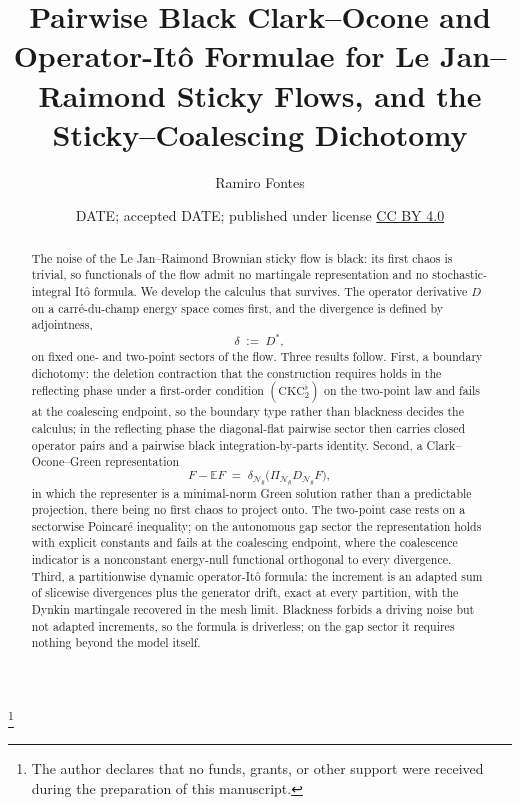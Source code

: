 \documentclass[reqno,final,11pt]{amsart}
\date{DATE; accepted DATE; published under license
\href{https://creativecommons.org/licenses/by/4.0/}{\textup{CC BY 4.0}}} %
\theoremstyle{plain}
\theoremstyle{definition}
\theoremstyle{remark}
\newcommand{\E}{\mathbb E}
\newcommand{\cN}{\mathcal N}
\newcommand{\PiN}{\Pi_{\cN_\theta}}
\begin{document}
\title[Black Clark--Ocone and Operator-It\^o for Sticky Flows]{Pairwise Black
Clark--Ocone and Operator-It\^o Formulae for Le Jan--Raimond Sticky Flows,
and the Sticky--Coalescing Dichotomy}

\author{Ramiro Fontes}
\address{Quijotic Research}

\thanks{The author declares that no funds, grants, or other support were
received during the preparation of this manuscript.}

\begin{abstract}
The noise of the Le Jan--Raimond Brownian sticky flow is black: its first
chaos is trivial, so functionals of the flow admit no martingale
representation and no stochastic-integral It\^o formula. We develop the
calculus that survives. The operator derivative $D$ on a carr\'e-du-champ
energy space comes first, and the divergence is defined by adjointness,
\[
  \delta\;:=\;D^{*},
\]
on fixed one- and two-point sectors of the flow. Three results follow. First,
a boundary dichotomy: the deletion contraction that the construction requires
holds in the reflecting phase under a first-order condition
$(\mathrm{CKC}_2^{\flat})$ on the two-point law and fails at the coalescing
endpoint, so the boundary type rather than blackness decides the calculus; in
the reflecting phase the diagonal-flat pairwise sector then carries closed
operator pairs and a pairwise black integration-by-parts identity. Second, a
Clark--Ocone--Green representation
\[
  F-\E F\;=\;\delta_{\cN_\theta}\bigl(\PiN D_{\cN_\theta}F\bigr),
\]
in which the representer is a minimal-norm Green solution rather than a
predictable projection, there being no first chaos to project onto. The
two-point case rests on a sectorwise Poincar\'e inequality; on the
autonomous gap sector the representation holds with
explicit constants and fails at the coalescing endpoint, where the
coalescence indicator is a nonconstant energy-null functional orthogonal to
every divergence. Third, a partitionwise dynamic operator-It\^o formula: the
increment is an adapted sum of slicewise divergences plus the generator
drift, exact at every partition, with the Dynkin martingale recovered in the
mesh limit. Blackness forbids a driving noise but not adapted increments, so
the formula is driverless; on the gap sector it requires nothing beyond the
model itself.
\end{abstract}
\end{document}
